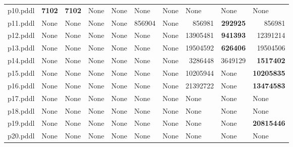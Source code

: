 \documentclass{article}
\begin{document}
\begin{tabular}{@{}lrrrrrrrrr@{}}
p10.pddl & \textbf{7102} & \textbf{7102} & \multicolumn{1}{|l|}{None} & \multicolumn{1}{|l|}{None} & \multicolumn{1}{|l|}{None} & \multicolumn{1}{|l|}{None} & \multicolumn{1}{|l|}{None} & \multicolumn{1}{|l|}{None} & \multicolumn{1}{|l|}{None} \\
p11.pddl & \multicolumn{1}{|l|}{None} & \multicolumn{1}{|l|}{None} & \multicolumn{1}{|l|}{None} & \multicolumn{1}{|l|}{None} & 856904 & \multicolumn{1}{|l|}{None} & 856981 & \textbf{292925} & 856981 \\
p12.pddl & \multicolumn{1}{|l|}{None} & \multicolumn{1}{|l|}{None} & \multicolumn{1}{|l|}{None} & \multicolumn{1}{|l|}{None} & \multicolumn{1}{|l|}{None} & \multicolumn{1}{|l|}{None} & 13905481 & \textbf{941393} & 12391214 \\
p13.pddl & \multicolumn{1}{|l|}{None} & \multicolumn{1}{|l|}{None} & \multicolumn{1}{|l|}{None} & \multicolumn{1}{|l|}{None} & \multicolumn{1}{|l|}{None} & \multicolumn{1}{|l|}{None} & 19504592 & \textbf{626406} & 19504506 \\
p14.pddl & \multicolumn{1}{|l|}{None} & \multicolumn{1}{|l|}{None} & \multicolumn{1}{|l|}{None} & \multicolumn{1}{|l|}{None} & \multicolumn{1}{|l|}{None} & \multicolumn{1}{|l|}{None} & 3286448 & 3649129 & \textbf{1517402} \\
p15.pddl & \multicolumn{1}{|l|}{None} & \multicolumn{1}{|l|}{None} & \multicolumn{1}{|l|}{None} & \multicolumn{1}{|l|}{None} & \multicolumn{1}{|l|}{None} & \multicolumn{1}{|l|}{None} & 10205944 & \multicolumn{1}{|l|}{None} & \textbf{10205835} \\
p16.pddl & \multicolumn{1}{|l|}{None} & \multicolumn{1}{|l|}{None} & \multicolumn{1}{|l|}{None} & \multicolumn{1}{|l|}{None} & \multicolumn{1}{|l|}{None} & \multicolumn{1}{|l|}{None} & 21392722 & \multicolumn{1}{|l|}{None} & \textbf{13474583} \\
p17.pddl & \multicolumn{1}{|l|}{None} & \multicolumn{1}{|l|}{None} & \multicolumn{1}{|l|}{None} & \multicolumn{1}{|l|}{None} & \multicolumn{1}{|l|}{None} & \multicolumn{1}{|l|}{None} & \multicolumn{1}{|l|}{None} & \multicolumn{1}{|l|}{None} & \multicolumn{1}{|l|}{None} \\
p18.pddl & \multicolumn{1}{|l|}{None} & \multicolumn{1}{|l|}{None} & \multicolumn{1}{|l|}{None} & \multicolumn{1}{|l|}{None} & \multicolumn{1}{|l|}{None} & \multicolumn{1}{|l|}{None} & \multicolumn{1}{|l|}{None} & \multicolumn{1}{|l|}{None} & \multicolumn{1}{|l|}{None} \\
p19.pddl & \multicolumn{1}{|l|}{None} & \multicolumn{1}{|l|}{None} & \multicolumn{1}{|l|}{None} & \multicolumn{1}{|l|}{None} & \multicolumn{1}{|l|}{None} & \multicolumn{1}{|l|}{None} & \multicolumn{1}{|l|}{None} & \multicolumn{1}{|l|}{None} & \textbf{20815446} \\
p20.pddl & \multicolumn{1}{|l|}{None} & \multicolumn{1}{|l|}{None} & \multicolumn{1}{|l|}{None} & \multicolumn{1}{|l|}{None} & \multicolumn{1}{|l|}{None} & \multicolumn{1}{|l|}{None} & \multicolumn{1}{|l|}{None} & \multicolumn{1}{|l|}{None} & \multicolumn{1}{|l|}{None} \\
\end{tabular}
\end{document}
